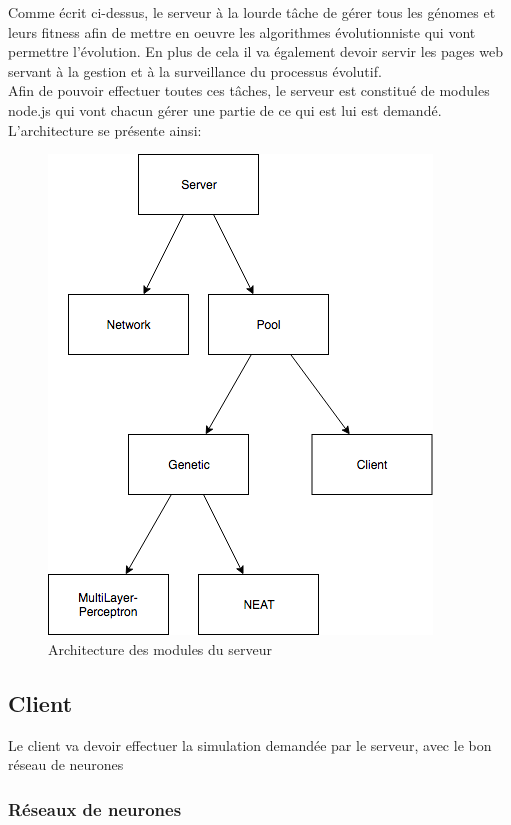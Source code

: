 \documentclass{article}
\begin{document}
Comme écrit ci-dessus, le serveur à la lourde tâche de gérer tous les génomes et leurs fitness afin de mettre en oeuvre les algorithmes évolutionniste qui vont permettre l'évolution. En plus de cela il va également devoir servir les pages web servant à la gestion et à la surveillance du processus évolutif.\\
Afin de pouvoir effectuer toutes ces tâches, le serveur est constitué de modules node.js qui vont chacun gérer une partie de ce qui est lui est demandé.\\
L'architecture se présente ainsi:
\begin{figure}[H]
\begin{center}
	\includegraphics[scale=0.5]{"server.png"} 
	\caption{Architecture des modules du serveur}
\end{center}
\end{figure}

\subsection{Client}

Le client va devoir effectuer la simulation demandée par le serveur, avec le bon réseau de neurones


\subsubsection{Réseaux de neurones}
\end{document}
